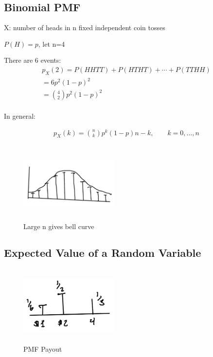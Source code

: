 \subsection{Binomial PMF}


X: number of heads in n fixed independent coin tosses

$P(H)=p$, let n=4

There are 6 events:
\begin{align*}
p_X(2)=P(HHTT) + P(HTHT) + \cdots + P(TTHH)\\
=6p^2(1-p)^2 \\
={4 \choose 2} p^2(1-p)^2 \\
\end{align*}

In general:

\begin{align}
p_X(k)={n \choose k} p^k(1-p)n-k, \qquad k=0,\ldots,n
\end{align}



\begin{figure}[h]
\centering
\includegraphics[width=5cm, height=4cm]{images/L05/bern_norm_approx.jpeg}
\caption{Large n gives bell curve}
\end{figure}

\subsection{Expected Value of a Random Variable}


\begin{figure}[h]
\centering
\includegraphics[width=5cm, height=4cm]{images/L05/EX_rv.jpeg}
\caption{PMF Payout}
\end{figure}

